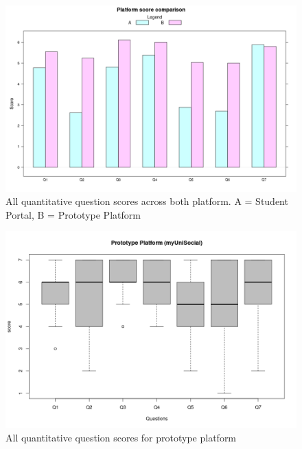 \documentclass[lettersize,journal]{IEEEtran}
\begin{document}
		\begin{figure}[h!]
        		\includegraphics[width=\linewidth]{images/GroupedBarComparison.png}
        		\caption{All quantitative question scores across both platform. A = Student Portal, B = Prototype Platform}
        		\label{figure 4}
		\end{figure}


		\begin{figure}[h!]
        		\includegraphics[width=\linewidth]{images/PrototypeFull.png}
        		\caption{All quantitative question scores for prototype platform}
        		\label{figure 5}
		\end{figure}
\end{document}

